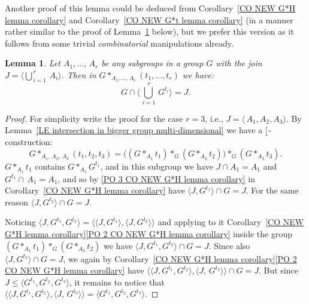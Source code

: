 \documentclass[12pt, a4paper]{amsart}
\newcommand{\1}{\{1\}}
\newcommand{\bigast}{\textrm{\footnotesize\ding{91}}}
\theoremstyle{plain}
\newtheorem{Lemma}[Theorem]{Lemma}
\theoremstyle{definition}
\theoremstyle{remark}
\numberwithin{equation}{section}
\begin{document}
Another proof of this lemma could be deduced from Corollary~\ref{CO NEW G*H lemma corollary} and 
Corollary~\ref{CO NEW G*t lemma corollary} (in a manner rather similar to the proof of Lemma~\ref{LE join in HNN extension multi-dimensional} below), but we prefer this version as it follows from some  trivial \textit{combinatorial} manipulations already. 


\begin{Lemma}
\label{LE join in HNN extension multi-dimensional}
Let $A_1,\ldots,\,A_r$ be any subgroups in a group $G$ with the join
$J=\big\langle\bigcup_{\,i=1}^{\,r} \,A_i\big\rangle$. 
Then in $G *_{A_1,\ldots,\,A_r} (t_1,\ldots,t_r)$ we have:
\begin{equation}
\label{EQ gemeral intersection in HNN multi-dimensional}
\textstyle 
G \cap \big\langle 
  \bigcup_{\,i=1}^{\,r} \,G^{t_i} \big\rangle
=J.
\end{equation}
\end{Lemma}

\begin{proof}
For simplicity write the proof for the case $r\!=\!3$, i.e.,  $J=\langle \, A_1, A_2, A_3\rangle$.
By Lemma~\ref{LE intersection in bigger group multi-dimensional} we have a $\bigast$-construction:
$$
G *_{A_1,\,A_2,\, A_3} (t_1,t_2,t_3)
= \big( (G *_{A_1} t_1)
*_G
(G *_{A_2} t_2)\big) 
*_G
(G *_{A_3} t_3).
$$
$G *_{A_1} t_1$ contains 
$G *_{A_1} \! G^{t_1}$, and in this subgroup we  have $J\! \cap A_1 = A_1$ and $G^{t_1}\! \cap\, A_1 = A_1$, and so 
by \eqref{PO 3 CO NEW G*H lemma corollary} in Corollary~\ref{CO NEW G*H lemma corollary} have $\langle J, G^{t_1}\rangle \cap G =  J$.
For the same reason $\langle  J, G^{t_2}\rangle \cap G =  J$.

Noticing 
$\langle  J, G^{t_1}\!, G^{t_2} \rangle = \big\langle 
\langle  J, G^{t_1} \rangle,
\langle  J, G^{t_2} \rangle
\big\rangle$
and applying to it 
Corollary~\ref{CO NEW G*H lemma corollary}\;\eqref{PO 2 CO NEW G*H lemma corollary} inside the group $(G *_{A_1} t_1)
*_G
(G *_{A_2} t_2)$ 
we have $\langle J, G^{t_1}\!, G^{t_2} \rangle \cap G = J$.
%
Since also $\langle J, G^{t_3}\rangle \cap G = J$, we again by Corollary~\ref{CO NEW G*H lemma corollary}\;\eqref{PO 2 CO NEW G*H lemma corollary} have 
$
\big\langle
\langle J, G^{t_1}\!, G^{t_2} \rangle, \langle J, \,G^{t_3}\rangle 
\big\rangle \cap G = J.
$
But since $J \le \langle 
G^{t_1}\!, G^{t_2}\!, G^{t_3}\rangle $, it remains to notice that
$\big\langle
\langle J, G^{t_1}\!, G^{t_2} \rangle, \langle J, \,G^{t_3}\rangle 
\big\rangle= \langle 
G^{t_1}\!, G^{t_2}\!, G^{t_3}\rangle$.
\end{proof}
\end{document}

